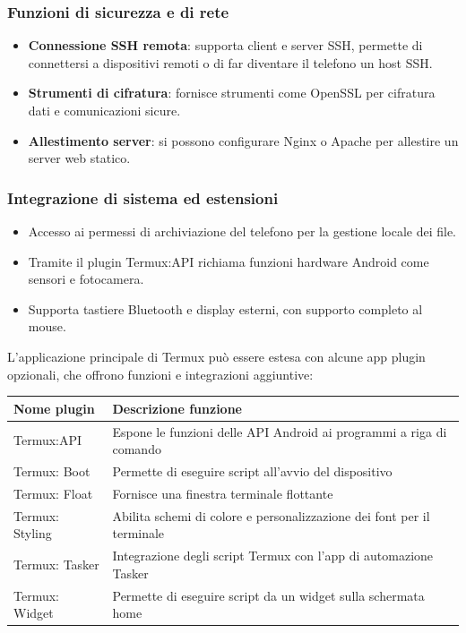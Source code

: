 \subsubsection*{Funzioni di sicurezza e di rete}

\begin{itemize}
  \item \textbf{Connessione SSH remota}: supporta client e server SSH, permette di connettersi a dispositivi remoti o di far diventare il telefono un host SSH.
  \item \textbf{Strumenti di cifratura}: fornisce strumenti come OpenSSL per cifratura dati e comunicazioni sicure.
  \item \textbf{Allestimento server}: si possono configurare Nginx o Apache per allestire un server web statico.
\end{itemize}

\subsubsection*{Integrazione di sistema ed estensioni}

\begin{itemize}
  \item Accesso ai permessi di archiviazione del telefono per la gestione locale dei file.
  \item Tramite il plugin Termux:API richiama funzioni hardware Android come sensori e fotocamera.
  \item Supporta tastiere Bluetooth e display esterni, con supporto completo al mouse.
\end{itemize}


L'applicazione principale di Termux può essere estesa con alcune app plugin opzionali, che offrono funzioni e integrazioni aggiuntive:

\begin{center}
\begin{tabularx}{\linewidth}{|X|X|}
\hline
\textbf{Nome plugin} & \textbf{Descrizione funzione} \tabularnewline
\hline
Termux:API & Espone le funzioni delle API Android ai programmi a riga di comando \tabularnewline
Termux: Boot & Permette di eseguire script all'avvio del dispositivo \tabularnewline
Termux: Float & Fornisce una finestra terminale flottante \tabularnewline
Termux: Styling & Abilita schemi di colore e personalizzazione dei font per il terminale \tabularnewline
Termux: Tasker & Integrazione degli script Termux con l'app di automazione Tasker \tabularnewline
Termux: Widget & Permette di eseguire script da un widget sulla schermata home \tabularnewline
\hline
\end{tabularx}
\end{center}

